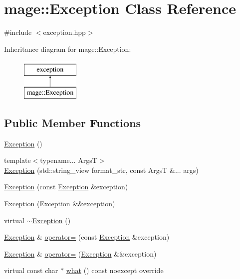 \hypertarget{classmage_1_1_exception}{}\section{mage\+:\+:Exception Class Reference}
\label{classmage_1_1_exception}


{\ttfamily \#include $<$exception.\+hpp$>$}

Inheritance diagram for mage\+:\+:Exception\+:\begin{figure}[H]
\begin{center}
\leavevmode
\includegraphics[height=2.000000cm]{classmage_1_1_exception}
\end{center}
\end{figure}
\subsection*{Public Member Functions}
\begin{DoxyCompactItemize}
\item 
\mbox{\hyperlink{classmage_1_1_exception_a87fd5f6c5465c01244020afbaebdb9f5}{Exception}} ()
\item 
{\footnotesize template$<$typename... ArgsT$>$ }\\\mbox{\hyperlink{classmage_1_1_exception_ab9d0c9f308dab96ff7ba4f6986f40743}{Exception}} (std\+::string\+\_\+view format\+\_\+str, const ArgsT \&... args)
\item 
\mbox{\hyperlink{classmage_1_1_exception_a3f8642ade2ed1168a9853a50ee0e8e98}{Exception}} (const \mbox{\hyperlink{classmage_1_1_exception}{Exception}} \&exception)
\item 
\mbox{\hyperlink{classmage_1_1_exception_a5a745eb8921cb986c822c0f95455314a}{Exception}} (\mbox{\hyperlink{classmage_1_1_exception}{Exception}} \&\&exception)
\item 
virtual \mbox{\hyperlink{classmage_1_1_exception_a088e91ba8dffd31a9d6aa7d4af2ee2c0}{$\sim$\+Exception}} ()
\item 
\mbox{\hyperlink{classmage_1_1_exception}{Exception}} \& \mbox{\hyperlink{classmage_1_1_exception_ab0e7e6b32b07505271a4a88067ab54f4}{operator=}} (const \mbox{\hyperlink{classmage_1_1_exception}{Exception}} \&exception)
\item 
\mbox{\hyperlink{classmage_1_1_exception}{Exception}} \& \mbox{\hyperlink{classmage_1_1_exception_aa9305c6bd8836f56ffa970473533f031}{operator=}} (\mbox{\hyperlink{classmage_1_1_exception}{Exception}} \&\&exception)
\item 
virtual const char $\ast$ \mbox{\hyperlink{classmage_1_1_exception_ae2bd4437e2b7c960f022f7d3bf79baa7}{what}} () const noexcept override
\end{DoxyCompactItemize}
